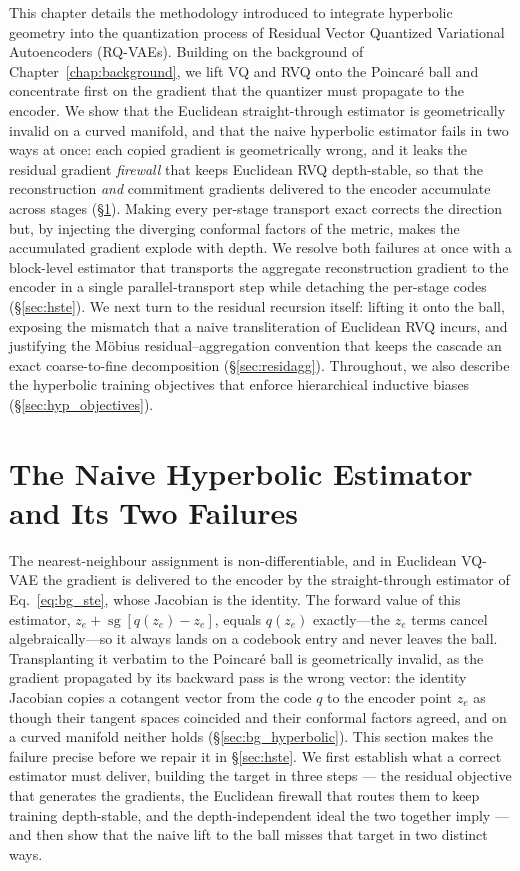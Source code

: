 \documentclass[12pt]{report}
\begin{document}
This chapter details the methodology introduced to integrate hyperbolic geometry into the quantization process of Residual Vector Quantized Variational Autoencoders (RQ-VAEs). Building on the background of Chapter~\ref{chap:background}, we lift VQ and RVQ onto the Poincar\'e ball and concentrate first on the gradient that the quantizer must propagate to the encoder. We show that the Euclidean straight-through estimator is geometrically invalid on a curved manifold, and that the naive hyperbolic estimator fails in two ways at once: each copied gradient is geometrically wrong, and it leaks the residual gradient \emph{firewall} that keeps Euclidean RVQ depth-stable, so that the reconstruction \emph{and} commitment gradients delivered to the encoder accumulate across stages (\S\ref{sec:firewall}). Making every per-stage transport exact corrects the direction but, by injecting the diverging conformal factors of the metric, makes the accumulated gradient explode with depth. We resolve both failures at once with a block-level estimator that transports the aggregate reconstruction gradient to the encoder in a single parallel-transport step while detaching the per-stage codes (\S\ref{sec:hste}). We next turn to the residual recursion itself: lifting it onto the ball, exposing the mismatch that a naive transliteration of Euclidean RVQ incurs, and justifying the M\"obius residual--aggregation convention that keeps the cascade an exact coarse-to-fine decomposition (\S\ref{sec:residagg}). Throughout, we also describe the hyperbolic training objectives that enforce hierarchical inductive biases (\S\ref{sec:hyp_objectives}).

\section{The Naive Hyperbolic Estimator and Its Two Failures}
\label{sec:firewall}
The nearest-neighbour assignment is non-differentiable, and in Euclidean VQ-VAE the gradient is delivered to the encoder by the straight-through estimator of Eq.~\ref{eq:bg_ste}, whose Jacobian is the identity. The forward value of this estimator, $z_e + \operatorname{sg}[q(z_e)-z_e]$, equals $q(z_e)$ exactly---the $z_e$ terms cancel algebraically---so it always lands on a codebook entry and never leaves the ball. Transplanting it verbatim to the Poincar\'e ball is geometrically invalid, as the gradient propagated by its backward pass is the wrong vector: the identity Jacobian copies a cotangent vector from the code $q$ to the encoder point $z_e$ as though their tangent spaces coincided and their conformal factors agreed, and on a curved manifold neither holds (\S\ref{sec:bg_hyperbolic}). This section makes the failure precise before we repair it in \S\ref{sec:hste}. We first establish what a correct estimator must deliver, building the target in three steps --- the residual objective that generates the gradients, the Euclidean firewall that routes them to keep training depth-stable, and the depth-independent ideal the two together imply --- and then show that the naive lift to the ball misses that target in two distinct ways.
\end{document}
